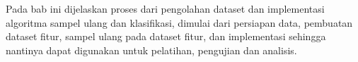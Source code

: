 Pada bab ini dijelaskan proses dari pengolahan dataset dan implementasi
algoritma sampel ulang dan klasifikasi, dimulai dari persiapan
data, pembuatan dataset fitur, sampel ulang pada dataset fitur, dan
implementasi sehingga nantinya dapat digunakan untuk pelatihan, pengujian dan
analisis.
